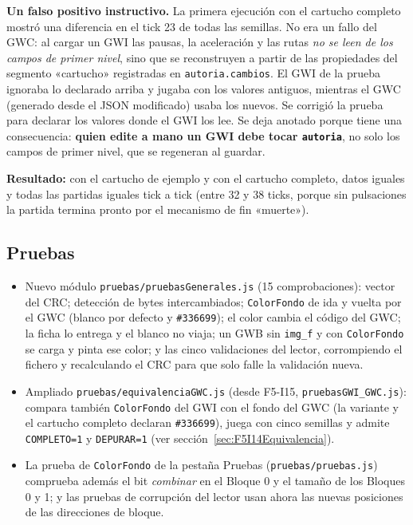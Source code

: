 \textbf{Un falso positivo instructivo.} La primera ejecución con el cartucho completo mostró una diferencia en el tick 23 de todas las semillas. No era un fallo del GWC: al cargar un GWI las pausas, la aceleración y las rutas \emph{no se leen de los campos de primer nivel}, sino que se reconstruyen a partir de las propiedades del segmento «cartucho» registradas en \texttt{autoria.cambios}. El GWI de la prueba ignoraba lo declarado arriba y jugaba con los valores antiguos, mientras el GWC (generado desde el JSON modificado) usaba los nuevos. Se corrigió la prueba para declarar los valores donde el GWI los lee. Se deja anotado porque tiene una consecuencia: \textbf{quien edite a mano un GWI debe tocar \texttt{autoria}}, no solo los campos de primer nivel, que se regeneran al guardar.

\textbf{Resultado:} con el cartucho de ejemplo y con el cartucho completo, datos iguales y todas las partidas iguales tick a tick (entre 32 y 38 ticks, porque sin pulsaciones la partida termina pronto por el mecanismo de fin «muerte»).

\subsection{Pruebas}
\label{sec:F5I14Pruebas}

\begin{itemize}
	\item Nuevo módulo \texttt{pruebas/pruebasGenerales.js} (15 comprobaciones): vector del CRC; detección de bytes intercambiados; \texttt{ColorFondo} de ida y vuelta por el GWC (blanco por defecto y \texttt{\#336699}); el color cambia el código del GWC; la ficha lo entrega y el blanco no viaja; un GWB sin \texttt{img\_f} y con \texttt{ColorFondo} se carga y pinta ese color; y las cinco validaciones del lector, corrompiendo el fichero y recalculando el CRC para que solo falle la validación nueva.
	
	\item Ampliado \texttt{pruebas/equivalenciaGWC.js} (desde F5-I15, \texttt{pruebasGWI\_GWC.js}): compara también \texttt{ColorFondo} del GWI con el fondo del GWC (la variante y el cartucho completo declaran \texttt{\#336699}), juega con cinco semillas y admite \texttt{COMPLETO=1} y \texttt{DEPURAR=1} (ver sección~\ref{sec:F5I14Equivalencia}).

	\item La prueba de \texttt{ColorFondo} de la pestaña Pruebas (\texttt{pruebas/pruebas.js}) comprueba además el bit \emph{combinar} en el Bloque 0 y el tamaño de los Bloques 0 y 1; y las pruebas de corrupción del lector usan ahora las nuevas posiciones de las direcciones de bloque.
\end{itemize}

